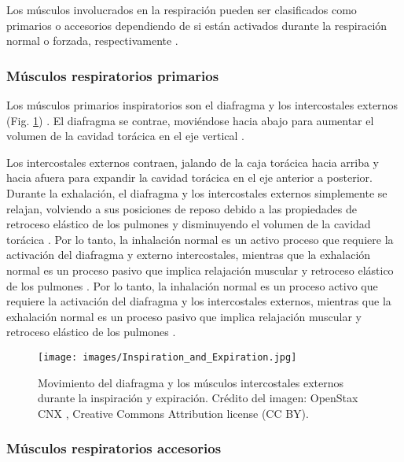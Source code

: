 \documentclass[12pt]{article}
\begin{document}
Los músculos involucrados en la respiración pueden ser clasificados
como primarios o accesorios dependiendo de si están activados durante
la respiración normal o forzada, respectivamente
\cite{sieck2013mechanical}.

\subsubsection*{Músculos respiratorios primarios}

Los músculos primarios inspiratorios son el diafragma y los
intercostales externos (Fig. \ref{fig:primary})
\cite{openStax2016resp}. El diafragma se contrae, moviéndose hacia
abajo para aumentar el volumen de la cavidad torácica en el eje
vertical \cite{guyton20006textbook}.

Los intercostales externos contraen, jalando de la caja torácica hacia
arriba y hacia afuera para expandir la cavidad torácica en el eje
anterior a posterior. Durante la exhalación, el diafragma y los
intercostales externos simplemente se relajan, volviendo a sus
posiciones de reposo debido a las propiedades de retroceso elástico de
los pulmones y disminuyendo el volumen de la cavidad torácica
\cite{guyton20006textbook}. Por lo tanto, la inhalación normal es un
activo proceso que requiere la activación del diafragma y externo
intercostales, mientras que la exhalación normal es un proceso pasivo
que implica relajación muscular y retroceso elástico de los pulmones
\cite{guyton20006textbook}. Por lo tanto, la inhalación normal es un
proceso activo que requiere la activación del diafragma y los
intercostales externos, mientras que la exhalación normal es un
proceso pasivo que implica relajación muscular y retroceso elástico de
los pulmones \cite{openStax2016resp}.

\begin{figure}[h!]
\centering
\texttt{[image: images/Inspiration\_and\_Expiration.jpg]}
\caption{Movimiento del diafragma y los músculos intercostales
  externos durante la inspiración y expiración. Crédito del imagen:
  OpenStax CNX \cite{openStax2016resp}, Creative Commons Attribution
  license (CC BY).}
\label{fig:primary}
\end{figure}

\subsubsection*{Músculos respiratorios accesorios}
\end{document}
